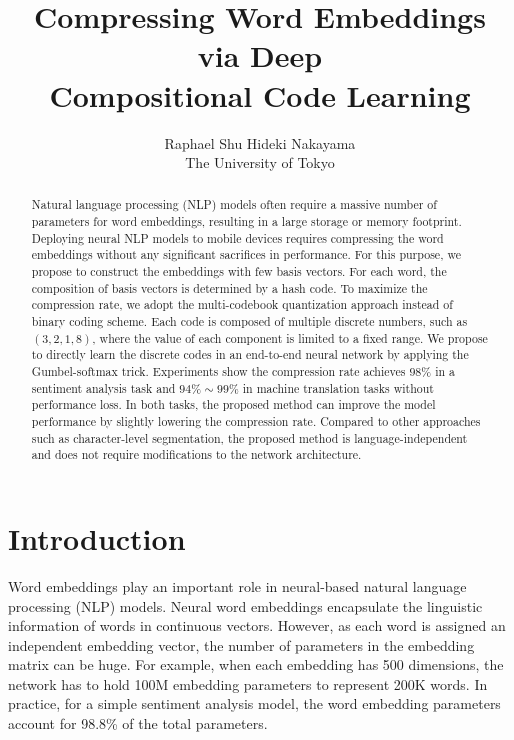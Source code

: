 \documentclass{article} %
\begin{document}
%
\title{Compressing Word Embeddings via Deep \\ Compositional Code Learning}

\author{Raphael Shu \: Hideki Nakayama \\
The University of Tokyo
}

\maketitle

\begin{abstract}
Natural language processing (NLP) models often require a massive number of parameters for word embeddings, resulting in a large storage or memory footprint. Deploying neural NLP models to mobile devices requires compressing the word embeddings without any significant sacrifices in performance. For this purpose, we propose to construct the embeddings with few basis vectors. For each word, the composition of basis vectors is determined by a hash code. To maximize the compression rate, we adopt the multi-codebook quantization approach instead of binary coding scheme. Each code is composed of multiple discrete numbers, such as $(3, 2, 1, 8)$, where the value of each component is limited to a fixed range. We propose to directly learn the discrete codes in an end-to-end neural network by applying the Gumbel-softmax trick. Experiments show the compression rate achieves $98\%$ in a sentiment analysis task and $94\% \sim 99\%$ in machine translation tasks without performance loss. In both tasks, the proposed method can improve the model performance by slightly lowering the compression rate. Compared to other approaches such as character-level segmentation, the proposed method is language-independent and does not require modifications to the network architecture.
\end{abstract}


\section{Introduction}
Word embeddings play an important role in neural-based natural language processing (NLP) models. Neural word embeddings encapsulate the linguistic information of words in continuous vectors. However, as each word is assigned an independent embedding vector, the number of parameters in the embedding matrix can be huge. For example, when each embedding has 500 dimensions, the network has to hold 100M embedding parameters to represent 200K words. In practice, for a simple sentiment analysis model, the word embedding parameters account for 98.8\% of the total parameters.
\end{document}
